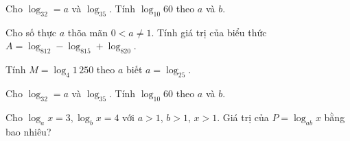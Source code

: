 \begin{bt}%
	Cho $\log_32=a$ và $\log_35$.  Tính $\log_{10}{60}$ theo $a$ và $b$.
\end{bt}

\begin{ex}%
	Cho số thực $a$ thõa mãn $0<a\neq 1$. Tính giá trị  của biểu thức $A=\log_812-\log_815+\log_820$.
\end{ex}

\begin{ex}%
	Tính $M=\log_4{1\,250}$ theo $a$ biết  $a=\log_25$.
\end{ex}

\begin{ex}%
	Cho $\log_32=a$ và $\log_35$. Tính $\log_{10}{60}$ theo  $a$ và $b$.
\end{ex}

\begin{bt}%
	Cho $\log_a x=3,\log_b x=4$ với $a > 1$, $b > 1$, $x >  1$. Giá trị của $P=\log _{ab} x$ bằng bao nhiêu?
\end{bt}

